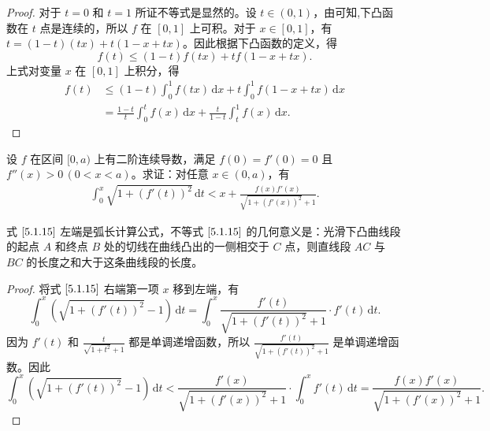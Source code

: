 \documentclass[../../main.tex]{subfiles}
\begin{document}
\begin{proof}
对于 \( t = 0 \) 和 \( t = 1 \) 所证不等式是显然的。设 \( t \in (0,1) \)，由可知,下凸函数在 \( t \) 点是连续的，所以 \( f \) 在 \([0,1]\) 上可积。对于 \( x \in [0,1] \)，有 \( t = (1 - t)(tx) + t(1 - x + tx) \)。因此根据下凸函数的定义，得
\[
f(t) \leqslant (1 - t)f(tx) + tf(1 - x + tx).
\]
上式对变量 \( x \) 在 \([0,1]\) 上积分，得
\begin{align*}
f(t) &\leqslant (1 - t) \int_{0}^{1} f(tx) \, \mathrm{d}x + t \int_{0}^{1} f(1 - x + tx) \, \mathrm{d}x
\\
&= \frac{1 - t}{t} \int_{0}^{t} f(x) \, \mathrm{d}x + \frac{t}{1 - t} \int_{t}^{1} f(x) \, \mathrm{d}x.
\end{align*}
\end{proof}

\begin{proposition}
设 \( f \) 在区间 \([0,a)\) 上有二阶连续导数，满足 \( f(0) = f'(0) = 0 \) 且 \( f''(x) > 0 \, (0 < x < a) \)。求证：对任意 \( x \in (0,a) \)，有
\begin{align}
\int_{0}^{x} \sqrt{1 + (f'(t))^2} \, \mathrm{d}t < x + \frac{f(x)f'(x)}{\sqrt{1 + (f'(x))^2} + 1}. \label{5.1.15}
\end{align}
\end{proposition}
\begin{remark}
式 \(\eqref{5.1.15}\) 左端是弧长计算公式，不等式 \(\eqref{5.1.15}\) 的几何意义是：光滑下凸曲线段的起点 \( A \) 和终点 \( B \) 处的切线在曲线凸出的一侧相交于 \( C \) 点，则直线段 \( AC \) 与 \( BC \) 的长度之和大于这条曲线段的长度。
\end{remark}
\begin{proof}
将式 \(\eqref{5.1.15}\) 右端第一项 \( x \) 移到左端，有
\[
\int_{0}^{x} \left( \sqrt{1 + (f'(t))^2} - 1 \right) \, \mathrm{d}t = \int_{0}^{x} \frac{f'(t)}{\sqrt{1 + (f'(t))^2} + 1} \cdot f'(t) \, \mathrm{d}t.
\]
因为 \( f'(t) \) 和 \( \frac{t}{\sqrt{1 + t^2} + 1} \) 都是单调递增函数，所以 \( \frac{f'(t)}{\sqrt{1 + (f'(t))^2} + 1} \) 是单调递增函数。因此
\[
\int_{0}^{x} \left( \sqrt{1 + (f'(t))^2} - 1 \right) \, \mathrm{d}t < \frac{f'(x)}{\sqrt{1 + (f'(x))^2} + 1} \cdot \int_{0}^{x} f'(t) \, \mathrm{d}t = \frac{f(x)f'(x)}{\sqrt{1 + (f'(x))^2} + 1}.
\]
\end{proof}
\end{document}
